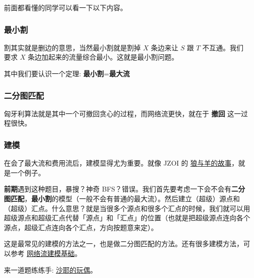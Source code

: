 前面都看懂的同学可以看一下以下内容。

\subsubsection{最小割}

割其实就是删边的意思，当然最小割就是割掉 $X$ 条边来让 $S$ 跟 $T$ 不互通。我们要求 $X$ 条边加起来的流量综合最小。这就是最小割问题。

其中我们要认识一个定理: \textbf{最小割}=\textbf{最大流}

\subsubsection{二分图匹配}

匈牙利算法就是其中一个可撤回贪心的过程，而网络流更快，就在于 \textbf{撤回} 这一过程很快。

\subsubsection{建模}

在会了最大流和费用流后，建模显得尤为重要。就像 JZOI 的 \href{https://www.luogu.org/problemnew/show/P2598}{狼与羊的故事}，就是一个例子。

\textbf{前期}遇到这种题目，暴搜？神奇 BFS？错误。我们首先要考虑一下会不会有\textbf{二分图匹配}，\textbf{最小割}的模型（一般不会有普通的最大流）。然后建立（超级）源点和（超级）汇点。什么意思？就是当很多个源点和很多个汇点的时候，我们就可以用超级源点和超级汇点代替「源点」和「汇点」的位置（也就是把超级源点连向各个源点，超级汇点连向各个汇点，方向按题意来定）。

这是最常见的建模的方法之一，也是做二分图匹配的方法。还有很多建模方法，可以参考 \href{https://www.cnblogs.com/victorique/p/8560656.html}{网络流建模基础}。

来一道题练练手: \href{https://www.luogu.org/paste/z3085b8l}{沙耶的玩偶}。
